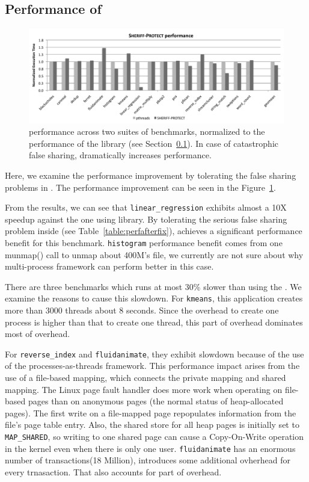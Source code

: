 \subsection{Performance of \sheriffprotect{}}
\label{sec:results-runtime-overhead}

\begin{figure}[!t]
\centering
\includegraphics[width=6in]{sheriff/figure/patrolperf.pdf}
\caption{\sheriffprotect{} performance across two suites of benchmarks,
  normalized to the performance of the \pthreads{} library (see
  Section~\ref{sec:results-runtime-overhead}). In case of
  catastrophic false sharing, \sheriffdetect{} dramatically increases performance.
\label{fig:patrol}}
\end{figure}

Here, we examine the performance improvement by tolerating the false sharing problems in
\sheriffprotect{}.
The performance improvement can be seen in the Figure~\ref{fig:patrol}.  

From the results, we can see that \texttt{linear\_regression} exhibits almost
a 10X speedup against the one using \pthreads{} library.  
By tolerating the serious false sharing problem inside (see
Table~\ref{table:perfafterfix}), \sheriffprotect{} achieves a significant performance 
benefit for this benchmark.
\texttt{histogram} performance benefit comes from one munmap() call to unmap about 400M's file, 
we currently are not sure about why multi-process framework can perform better in this case.

There are three benchmarks which runs at most 30\% slower than using the \pthreads{}. 
We examine the reasons to cause this slowdown. 
For \texttt{kmeans}, this application creates more than 3000 threads about 8 seconds. Since the overhead
to create one process is higher than that to create one thread, this part of 
overhead dominates most of overhead. 

For \texttt{reverse\_index} and \texttt{fluidanimate}, 
they exhibit slowdown because of the use of the processes-as-threads framework. 
This performance impact arises
from the use of a file-based mapping, which connects the private
mapping and shared mapping. The Linux page fault handler does more
work when operating on file-based pages than on anonymous pages (the
normal status of heap-allocated pages). The first write on a
file-mapped page repopulates information from the file's page table
entry. Also, the shared store for all heap pages is initially set to
\texttt{MAP\_SHARED}, so writing to one shared page can cause a
Copy-On-Write operation in the kernel even when there is only one user.
\texttt{fluidanimate} has an enormous number of transactions(18 Million), \sheriffprotect{} 
introduces some additional ovherhead for every trnasaction. That also accounts for part of
overhead.
